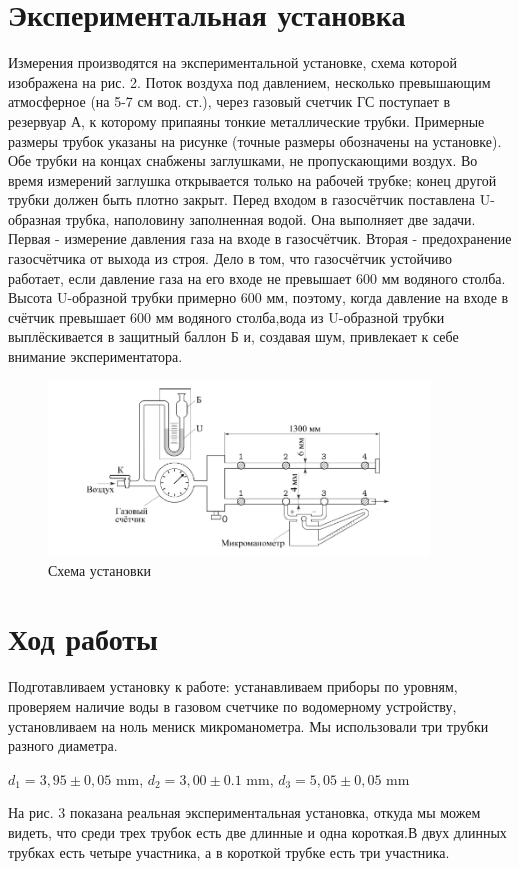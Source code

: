 \documentclass[a4paper, 12pt]{article}%
\begin{document}
\section{Экспериментальная установка}
Измерения производятся на экспериментальной установке, схема которой изображена на рис. 2. Поток воздуха под давлением, несколько превышающим атмосферное (на 5-7 см вод. ст.), через газовый счетчик ГС поступает в резервуар А, к которому припаяны тонкие металлические трубки. Примерные размеры трубок указаны на рисунке (точные размеры обозначены на установке). Обе трубки на концах снабжены заглушками, не пропускающими воздух. Во время измерений заглушка открывается только на рабочей трубке; конец другой трубки должен быть плотно закрыт. Перед входом в газосчётчик поставлена U-образная трубка, наполовину заполненная водой. Она выполняет две задачи. Первая - измерение давления газа на входе в газосчётчик. Вторая - предохранение газосчётчика от выхода из строя. Дело в том, что газосчётчик устойчиво работает, если давление газа на его входе не превышает 600 мм водяного столба. Высота U-образной трубки примерно 600 мм, поэтому, когда давление на входе в счётчик превышает 600 мм водяного столба,вода из U-образной трубки выплёскивается в защитный баллон Б и, создавая шум, привлекает к себе внимание экспериментатора.

\begin{figure}[h]
\begin{center}
\includegraphics[width = 0.9\textwidth]{fig2.jpg}
\caption{Схема установки}
\end{center}
\end{figure}

\section{Ход работы}
Подготавливаем установку к работе: устанавливаем приборы по уровням, проверяем наличие воды в газовом счетчике по водомерному устройству, установливаем на ноль мениск микроманометра. Мы использовали три трубки разного диаметра.
\begin{center}
$d_1=3,95 \pm 0,05$ mm, $d_2=3,00 \pm 0.1$ mm, $d_3=5,05 \pm 0,05$ mm\\
\end{center}
На рис. 3 показана реальная экспериментальная установка, откуда мы можем видеть, что среди трех трубок есть две длинные и одна короткая.В двух длинных трубках есть четыре участника, а в короткой трубке есть три участника.
\end{document}
